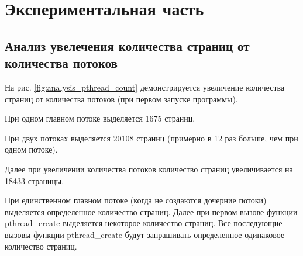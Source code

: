 \chapter{Экспериментальная часть}

\section{Анализ увелечения количества страниц от количества потоков}

На рис. \ref{fig:analysis_pthread_count} демонстрируется
увеличение количества страниц от количества потоков (при первом запуске программы).

При одном главном потоке выделяется 1675 страниц.

При двух потоках выделяется 20108 страниц (примерно в 12 раз больше, чем при одном потоке).

Далее при увеличении количества потоков количество страниц увеличивается на 18433 страницы.

При единственном главном потоке (когда не создаются дочерние потоки) 
выделяется определенное количество страниц. 
Далее при первом вызове функции pthread\_create выделяется некоторое количество страниц.
Все последующие вызовы функции pthread\_create будут запрашивать 
определенное одинаковое количество страниц. 


\begin{figure}[ht!]
\end{figure}

